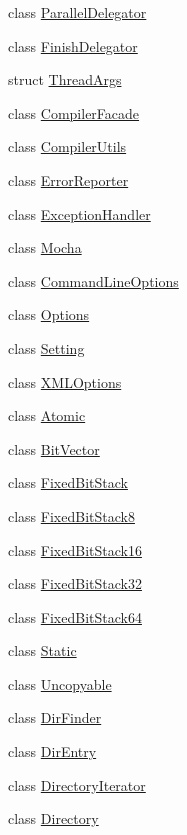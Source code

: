 \begin{DoxyCompactItemize}
class \hyperlink{classmocha_1_1_parallel_delegator}{ParallelDelegator}
\item 
class \hyperlink{classmocha_1_1_finish_delegator}{FinishDelegator}
\item 
struct \hyperlink{structmocha_1_1_thread_args}{ThreadArgs}
\item 
class \hyperlink{classmocha_1_1_compiler_facade}{CompilerFacade}
\item 
class \hyperlink{classmocha_1_1_compiler_utils}{CompilerUtils}
\item 
class \hyperlink{classmocha_1_1_error_reporter}{ErrorReporter}
\item 
class \hyperlink{classmocha_1_1_exception_handler}{ExceptionHandler}
\item 
class \hyperlink{classmocha_1_1_mocha}{Mocha}
\item 
class \hyperlink{classmocha_1_1_command_line_options}{CommandLineOptions}
\item 
class \hyperlink{classmocha_1_1_options}{Options}
\item 
class \hyperlink{classmocha_1_1_setting}{Setting}
\item 
class \hyperlink{classmocha_1_1_x_m_l_options}{XMLOptions}
\item 
class \hyperlink{classmocha_1_1_atomic}{Atomic}
\item 
class \hyperlink{classmocha_1_1_bit_vector}{BitVector}
\item 
class \hyperlink{classmocha_1_1_fixed_bit_stack}{FixedBitStack}
\item 
class \hyperlink{classmocha_1_1_fixed_bit_stack8}{FixedBitStack8}
\item 
class \hyperlink{classmocha_1_1_fixed_bit_stack16}{FixedBitStack16}
\item 
class \hyperlink{classmocha_1_1_fixed_bit_stack32}{FixedBitStack32}
\item 
class \hyperlink{classmocha_1_1_fixed_bit_stack64}{FixedBitStack64}
\item 
class \hyperlink{classmocha_1_1_static}{Static}
\item 
class \hyperlink{classmocha_1_1_uncopyable}{Uncopyable}
\item 
class \hyperlink{classmocha_1_1_dir_finder}{DirFinder}
\item 
class \hyperlink{classmocha_1_1_dir_entry}{DirEntry}
\item 
class \hyperlink{classmocha_1_1_directory_iterator}{DirectoryIterator}
\item 
class \hyperlink{classmocha_1_1_directory}{Directory}

\end{DoxyCompactItemize}
